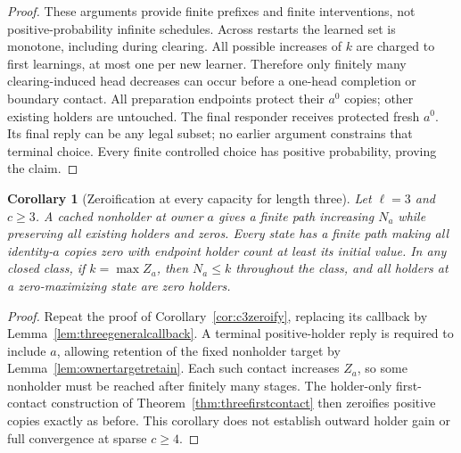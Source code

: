 \documentclass[11pt]{article}
\newtheorem{corollary}[theorem]{Corollary}
\begin{document}
\begin{proof}
These arguments provide finite prefixes and finite interventions,
not positive-probability infinite schedules. Across restarts the
learned set is monotone, including during clearing. All possible
increases of $k$ are charged to first learnings, at most one per
new learner. Therefore only finitely many clearing-induced head
decreases can occur before a one-head completion or boundary
contact. All preparation endpoints protect their $a^0$ copies;
other existing holders are untouched. The final responder receives
protected fresh $a^0$. Its final reply can be any legal subset;
no earlier argument constrains that terminal choice. Every finite
controlled choice has positive probability, proving the claim.
\end{proof}

\begin{corollary}[Zeroification at every capacity for length three]
\label{cor:threegeneralzeroify}
Let $\ell=3$ and $c\ge3$. A cached nonholder at owner $a$
gives a finite path increasing $N_a$ while preserving all
existing holders and zeros. Every state has a finite path
making all identity-$a$ copies zero with endpoint holder count
at least its initial value. In any closed class, if $k=\max Z_a$,
then $N_a\le k$ throughout the class, and all holders at a
zero-maximizing state are zero holders.
\end{corollary}
\begin{proof}
Repeat the proof of Corollary~\ref{cor:c3zeroify}, replacing
its callback by Lemma~\ref{lem:threegeneralcallback}. A terminal
positive-holder reply is required to include $a$, allowing
retention of the fixed nonholder target by
Lemma~\ref{lem:ownertargetretain}. Each such contact increases
$Z_a$, so some nonholder must be reached after finitely many
stages. The holder-only first-contact construction of
Theorem~\ref{thm:threefirstcontact} then zeroifies positive
copies exactly as before. This corollary does not establish
outward holder gain or full convergence at sparse $c\ge4$.
\end{proof}
\end{document}
